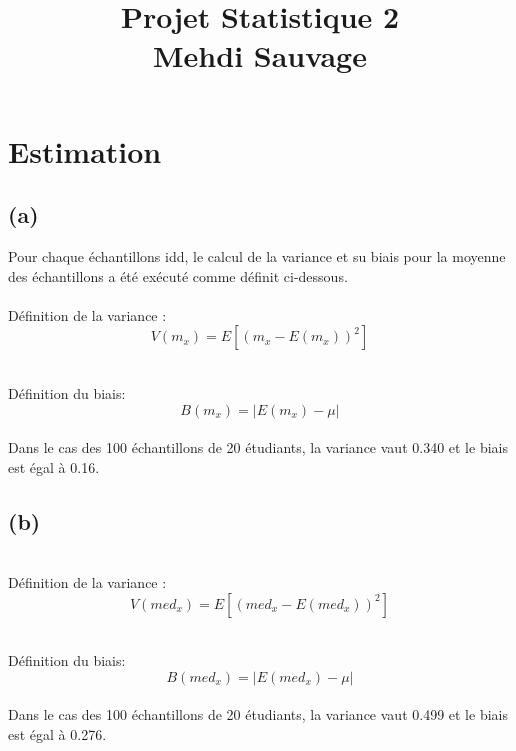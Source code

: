 \documentclass[10pt,a4paper]{article}
\title{Projet Statistique 2 \\ Mehdi Sauvage}
\begin{document}


\maketitle
\newpage

\section{Estimation}

 

\subsection*{(a)}
Pour chaque échantillons idd, le calcul de la variance et su biais pour la moyenne des échantillons a été exécuté comme définit ci-dessous.\\ \\
Définition de la variance : 
\[ V(m_x) = E\left[(m_x - E(m_x))^2\right] \]

\ \\
Définition du biais:
\[ B(m_x) = |E(m_x) - \mu| \]\\

Dans le cas des 100 échantillons de 20 étudiants, la variance vaut 0.340 et le biais est égal à 0.16.

\subsection*{(b)}

 \ \\
Définition de la variance : 
\[ V(med_x) = E\left[(med_x - E(med_x))^2\right] \]

\ \\
Définition du biais:
\[ B(med_x) = |E(med_x) - \mu| \]\\
Dans le cas des 100 échantillons de 20 étudiants, la variance vaut 0.499 et le biais est égal à 0.276.
\end{document}
